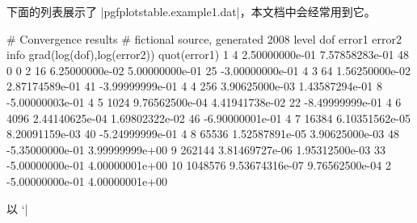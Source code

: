 \documentclass[a4paper,doc2]{ltxdoc}
\begin{document}
\noindent 下面的列表展示了 |pgfplotstable.example1.dat|，本文档中会经常用到它。
%
\begin{codeexample}
# Convergence results
# fictional source, generated 2008
level    dof      error1            error2   info     grad(log(dof),log(error2)) quot(error1)
1        4        2.50000000e-01    7.57858283e-01    48       0                 0
2        16       6.25000000e-02    5.00000000e-01    25       -3.00000000e-01   4
3        64       1.56250000e-02    2.87174589e-01    41       -3.99999999e-01   4
4        256      3.90625000e-03    1.43587294e-01    8        -5.00000003e-01   4
5        1024     9.76562500e-04    4.41941738e-02    22       -8.49999999e-01   4
6        4096     2.44140625e-04    1.69802322e-02    46       -6.90000001e-01   4
7        16384    6.10351562e-05    8.20091159e-03    40       -5.24999999e-01   4
8        65536    1.52587891e-05    3.90625000e-03    48       -5.35000000e-01   3.99999999e+00
9        262144   3.81469727e-06    1.95312500e-03    33       -5.00000000e-01   4.00000001e+00
10       1048576  9.53674316e-07    9.76562500e-04    2        -5.00000000e-01   4.00000001e+00
\end{codeexample}
%
以 `|%
\end{document}
